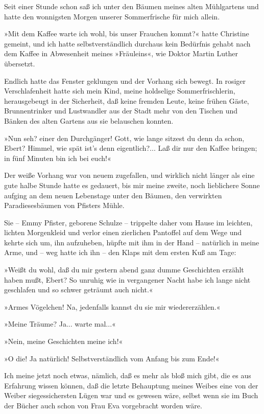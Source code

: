 Seit einer Stunde schon saß ich unter den Bäumen meines alten
Mühlgartens und hatte den wonnigsten Morgen unserer Sommerfrische
für mich allein.

»Mit dem Kaffee warte ich wohl, bis unser Frauchen kommt?« hatte
Christine gemeint, und ich hatte selbstverständlich durchaus kein
Bedürfnis gehabt nach dem Kaffee in Abwesenheit meines »Fräuleins«,
wie Doktor Martin Luther übersetzt.

Endlich hatte das Fenster geklungen und der Vorhang sich bewegt. In
rosiger Verschlafenheit hatte sich mein Kind, meine holdselige
Sommerfrischlerin, herausgebeugt in der Sicherheit, daß keine
fremden Leute, keine frühen Gäste, Brunnentrinker und Lustwandler
aus der Stadt mehr von den Tischen und Bänken des alten Gartens aus
sie belauschen konnten.

»Nun seh? einer den Durchgänger! Gott, wie lange sitzest du denn da
schon, Ebert? Himmel, wie spät ist's denn eigentlich?... Laß dir
nur den Kaffee bringen; in fünf Minuten bin ich bei euch!«

Der weiße Vorhang war von neuem zugefallen, und wirklich nicht
länger als eine gute halbe Stunde hatte es gedauert, bis mir meine
zweite, noch lieblichere Sonne aufging an dem neuen Lebenstage
unter den Bäumen, den verwirkten Paradiesesbäumen von Pfisters
Mühle.

Sie – Emmy Pfister, geborene Schulze – trippelte daher vom Hause im
leichten, lichten Morgenkleid und verlor einen zierlichen Pantoffel
auf dem Wege und kehrte sich um, ihn aufzuheben, hüpfte mit ihm in
der Hand – natürlich in meine Arme, und – weg hatte ich ihn – den
Klaps mit dem ersten Kuß am Tage:

»Weißt du wohl, daß du mir gestern abend ganz dumme Geschichten
erzählt haben mußt, Ebert? So unruhig wie in vergangener Nacht habe
ich lange nicht geschlafen und so schwer geträumt auch nicht.«

»Armes Vögelchen! Na, jedenfalls kannst du sie mir
wiedererzählen.«

»Meine Träume? Ja... warte mal...«

»Nein, meine Geschichten meine ich!«

»O die! Ja natürlich! Selbstverständlich vom Anfang bis zum Ende!«

Ich meine jetzt noch etwas, nämlich, daß es mehr als bloß mich
gibt, die es aus Erfahrung wissen können, daß die letzte Behauptung
meines Weibes eine von der Weiber siegessichersten Lügen war und es
gewesen wäre, selbst wenn sie im Buch der Bücher auch schon von
Frau Eva vorgebracht worden wäre.

